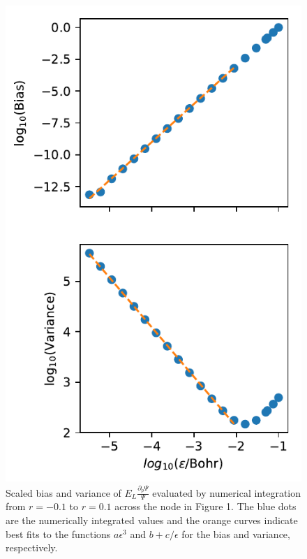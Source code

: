 \documentclass[twocolumn]{revtex4-1}
\begin{document}
\begin{figure}
\includegraphics{../2_plots/integratenode.pdf}
\caption{Scaled bias and variance of $E_L\frac{\partial_p \Psi}{\Psi}$ evaluated by numerical integration from $r = -0.1$ to $r = 0.1$ across the node in Figure 1. The blue dots are the numerically integrated values and the orange curves indicate best fits to the functions $a\epsilon^3$ and $b + c/\epsilon$ for the bias and variance, respectively.}
\end{figure}
\end{document}

